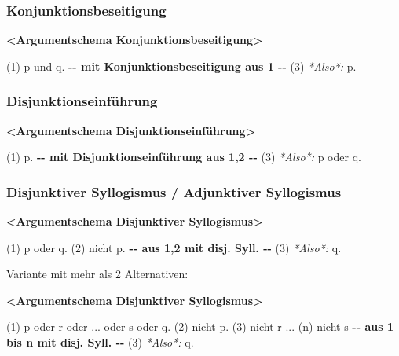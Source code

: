 \documentclass[
  english,
  a4paper,
]{article}
\newenvironment{Shaded}{\begin{snugshade}}{\end{snugshade}}
\newcommand{\AlertTok}[1]{\textcolor[rgb]{0.02,0.51,0.79}{\textbf{#1}}}
\newcommand{\ErrorTok}[1]{\textcolor[rgb]{0.02,0.51,0.79}{#1}}
\newcommand{\FloatTok}[1]{\textcolor[rgb]{0.12,0.11,0.11}{\textit{#1}}}
\newcommand{\NormalTok}[1]{\textcolor[rgb]{0.12,0.11,0.11}{#1}}
\newcommand{\WarningTok}[1]{\textcolor[rgb]{0.46,0.73,0.89}{\textbf{#1}}}
\renewenvironment{Shaded}{\centering \begin{mdframed}[style=codedefault]}{\end{mdframed}}%
\newenvironment{Shaded}{\centering \begin{mdframed}[style=codedefault]}{\end{mdframed}}%
\begin{document}
\subsubsection{Konjunktionsbeseitigung}\label{konjunktionsbeseitigung}

\begin{Shaded}
\begin{Highlighting}[]
\AlertTok{\textless{}Argumentschema Konjunktionsbeseitigung\textgreater{}}

\ErrorTok{(1)}\NormalTok{ p und q.}
\WarningTok{{-}{-} mit Konjunktionsbeseitigung aus 1 {-}{-}}
\ErrorTok{(3)}\FloatTok{ *Also*:}\NormalTok{ p.}
\end{Highlighting}
\end{Shaded}

\subsubsection{Disjunktionseinführung}\label{disjunktionseinfuxfchrung}

\begin{Shaded}
\begin{Highlighting}[]
\AlertTok{\textless{}Argumentschema Disjunktionseinführung\textgreater{}}

\ErrorTok{(1)}\NormalTok{ p.}
\WarningTok{{-}{-} mit Disjunktionseinführung aus 1,2 {-}{-}}
\ErrorTok{(3)}\FloatTok{ *Also*:}\NormalTok{ p oder q.}
\end{Highlighting}
\end{Shaded}

\subsubsection{Disjunktiver Syllogismus / Adjunktiver
Syllogismus}\label{disjunktiver-syllogismus-adjunktiver-syllogismus}

\begin{Shaded}
\begin{Highlighting}[]
\AlertTok{\textless{}Argumentschema Disjunktiver Syllogismus\textgreater{}}

\ErrorTok{(1)}\NormalTok{ p oder q.}
\ErrorTok{(2)}\NormalTok{ nicht p.}
\WarningTok{{-}{-} aus 1,2 mit disj. Syll. {-}{-}}
\ErrorTok{(3)}\FloatTok{ *Also*:}\NormalTok{ q.}
\end{Highlighting}
\end{Shaded}

Variante mit mehr als 2 Alternativen:

\begin{Shaded}
\begin{Highlighting}[]
\AlertTok{\textless{}Argumentschema Disjunktiver Syllogismus\textgreater{}}

\ErrorTok{(1)}\NormalTok{ p oder r oder ... oder s oder q.}
\ErrorTok{(2)}\NormalTok{ nicht p.}
\ErrorTok{(3)}\NormalTok{ nicht r}
\NormalTok{    ...}
\NormalTok{(n) nicht s}
\WarningTok{{-}{-} aus 1 bis n mit disj. Syll. {-}{-}}
\ErrorTok{(3)}\FloatTok{ *Also*:}\NormalTok{ q.}
\end{Highlighting}
\end{Shaded}
\end{document}

